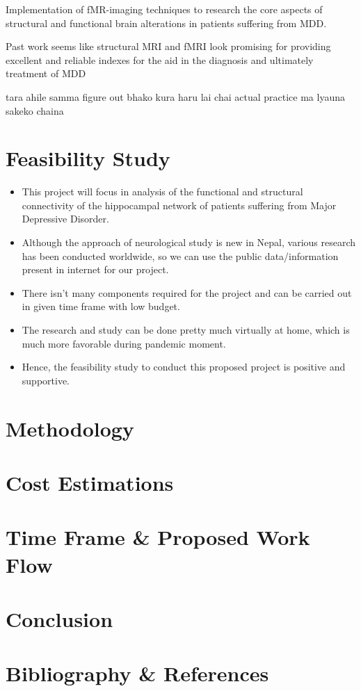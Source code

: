 \documentclass{article}
\begin{document}

Implementation of fMR-imaging techniques to research the core aspects
of structural and functional brain alterations in patients suffering
from MDD.

Past work seems like structural MRI and fMRI look promising for
providing excellent and reliable indexes for the aid in the diagnosis
and ultimately treatment of MDD



tara ahile samma figure out bhako kura haru lai chai actual practice
ma lyauna sakeko chaina

\section{Feasibility Study}

\begin{itemize}

  \item This project will focus in analysis of the functional and
    structural connectivity of the hippocampal network of patients
    suffering from Major Depressive Disorder.

  \item Although the approach of neurological study is new in Nepal,
    various research has been conducted worldwide, so we can use the
    public data/information present in internet for our project.

  \item There isn't many components required for the project and can
    be carried out in given time frame with low budget.

  \item The research and study can be done pretty much virtually at
    home, which is much more favorable during pandemic moment.

  \item Hence, the feasibility study to conduct this proposed project
    is positive and supportive.

\end{itemize}

\section{Methodology}
\section{Cost Estimations}
\section{Time Frame \& Proposed Work Flow}
\section{Conclusion}
\section{Bibliography \& References}
\end{document}
